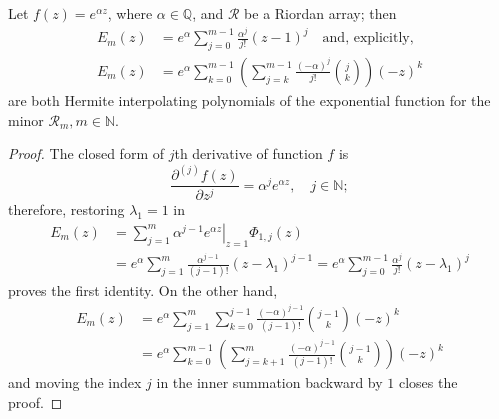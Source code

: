 
\begin{theorem}
\label{thm:exp-Hermite-interpolating-poly}
Let $f(z)=e^{\alpha z}$, where $\alpha\in\mathbb{Q}$, and $\mathcal{R}$ be a Riordan array; then 
\begin{equation}
\begin{split}
  E_{m}(z) &= e^{\alpha} \sum_{j=0}^{m-1}{\frac{\alpha^{j}}{j!}\left(z-1\right)^{j}}
  \quad\text{and, explicitly,}\\
  E_{m}(z) &= e^{\alpha}\sum_{k=0}^{m-1}{\left(\sum_{j=k}^{m-1}{\frac{(-\alpha)^{j}}{j!}{{j}\choose{k}}}\right)(-z)^{k}}
\end{split}
\end{equation}
are both Hermite interpolating polynomials of the exponential function for the minor
$\mathcal{R}_{m}, m\in\mathbb{N}$.
\end{theorem}

\begin{proof}
The closed form of $j$th derivative of function $f$ is 
\begin{displaymath}
\frac{\partial^{(j)}{f}(z)}{\partial{z}^{j}} = \alpha^{j} e^{\alpha z}, \quad j\in\mathbb{N};
\end{displaymath}
therefore, restoring $\lambda_{1}=1$ in
\begin{displaymath}
\begin{split}
  E_{m}(z)  &= \sum_{j=1}^{m}{ \left. \alpha^{j-1} e^{\alpha z} \right|_{z=1}\Phi_{1,j}(z)}\\
            &= e^{\alpha}\sum_{j=1}^{m}{\frac{\alpha^{j-1}}{(j-1)!} \left(z-\lambda_{1}\right)^{j-1}}
             = e^{\alpha}\sum_{j=0}^{m-1}{\frac{\alpha^{j}}{j!} \left(z-\lambda_{1}\right)^{j}}
\end{split}
\end{displaymath}
proves the first identity. On the other hand,
\begin{displaymath}
\begin{split}
  E_{m}(z)  &= e^{\alpha}\sum_{j=1}^{m}{\sum_{k=0}^{j-1}{\frac{(-\alpha)^{j-1}}{(j-1)!}{{j-1}\choose{k}}(-z)^{k}}} \\
            &= e^{\alpha}\sum_{k=0}^{m-1}{\left(\sum_{j=k+1}^{m}{\frac{(-\alpha)^{j-1}}{(j-1)!}{{j-1}\choose{k}}}\right)(-z)^{k}}
\end{split}
\end{displaymath}
and moving the index $j$ in the inner summation backward by $1$ closes the proof.
\end{proof}

